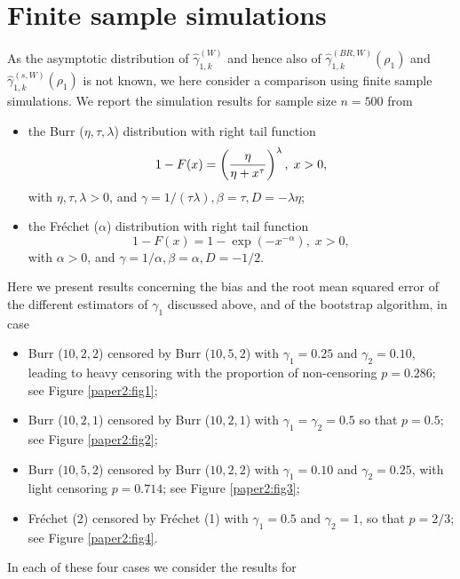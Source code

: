 \section{Finite sample simulations} 
\label{chap4:Sec4}

As the asymptotic distribution of $\hat{\gamma}_{1,k}^{(W)}$ and hence also of $\hat{\gamma}_{1,k}^{(BR,W)}(\rho_1)$ and $\hat{\gamma}_{1,k}^{(s,W)}(\rho_1)$ is not known, we here consider a comparison using finite sample simulations. 
 We report the simulation results for sample size $n=500$ from
\begin{itemize}
\item the Burr ($\eta,\tau,\lambda$) distribution with right tail function 
$$
1-F(x) = \left({\eta \over \eta + x^{\tau}} \right)^{\lambda}, \; x>0,
$$
with $\eta,\tau,\lambda >0$, and $\gamma = 1/(\tau\lambda), \beta = \tau, D= -\lambda \eta$;
\item the Fr\'echet ($\alpha$) distribution with right tail function 
$$
1-F(x) = 1-\exp (-x^{-\alpha}), \; x>0,
$$
with $\alpha >0$, and $\gamma = 1/\alpha, \beta = \alpha, D= -1/2$.
\end{itemize}
Here we present results concerning the bias and the root mean squared error of the different estimators of $\gamma_1$ discussed above, and of the bootstrap algorithm, in case 
\begin{itemize}
\item Burr ($10,2,2$) censored by Burr ($10,5,2$) with $\gamma_1=0.25$ and $\gamma_2=0.10$, leading to heavy censoring with the proportion of non-censoring $p=0.286$; see Figure \ref{paper2:fig1};
\item Burr ($10,2,1$) censored by Burr ($10,2,1$) with $\gamma_1=\gamma_2=0.5$ so that $p=0.5$; see Figure \ref{paper2:fig2};
\item Burr ($10,5,2$) censored by Burr ($10,2,2$) with $\gamma_1=0.10$ and $\gamma_2=0.25$, with light censoring $p=0.714$; see Figure \ref{paper2:fig3};
\item Fr\'echet (2) censored by Fr\'echet (1) with $\gamma_1=0.5$ and $\gamma_2=1$, so that $p=2/3$; see Figure \ref{paper2:fig4}.
\end{itemize} 
In each of these four cases we consider the results for
